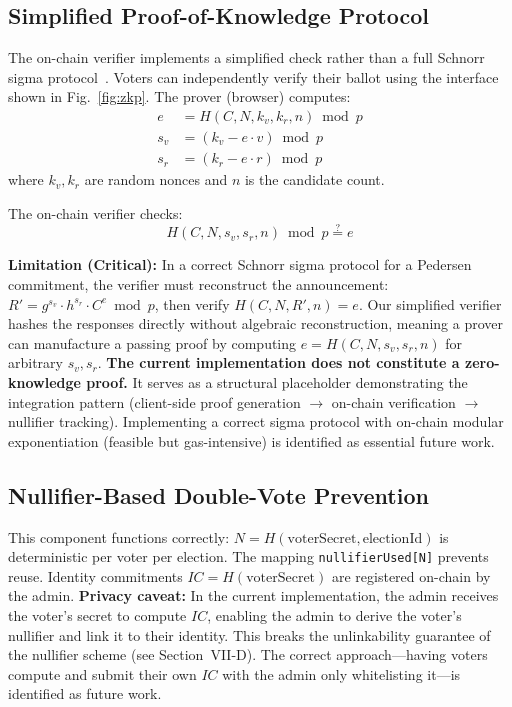\documentclass[conference]{IEEEtran}
\begin{document}
\subsection{Simplified Proof-of-Knowledge Protocol}

The on-chain verifier implements a simplified check rather than a full Schnorr sigma protocol~\cite{schnorr1991}. Voters can independently verify their ballot using the interface shown in Fig.~\ref{fig:zkp}. The prover (browser) computes:
\begin{align}
e &= H(C, N, k_v, k_r, n) \bmod p \\
s_v &= (k_v - e \cdot v) \bmod p \\
s_r &= (k_r - e \cdot r) \bmod p
\end{align}
where $k_v, k_r$ are random nonces and $n$ is the candidate count.

The on-chain verifier checks:
\[ H(C, N, s_v, s_r, n) \bmod p \stackrel{?}{=} e \]

\textbf{Limitation (Critical):} In a correct Schnorr sigma protocol for a Pedersen commitment, the verifier must reconstruct the announcement: $R' = g^{s_v} \cdot h^{s_r} \cdot C^e \bmod p$, then verify $H(C, N, R', n) = e$. Our simplified verifier hashes the responses directly without algebraic reconstruction, meaning a prover can manufacture a passing proof by computing $e = H(C, N, s_v, s_r, n)$ for arbitrary $s_v, s_r$. \textbf{The current implementation does not constitute a zero-knowledge proof.} It serves as a structural placeholder demonstrating the integration pattern (client-side proof generation $\rightarrow$ on-chain verification $\rightarrow$ nullifier tracking). Implementing a correct sigma protocol with on-chain modular exponentiation (feasible but gas-intensive) is identified as essential future work.

\subsection{Nullifier-Based Double-Vote Prevention}
This component functions correctly: $N = H(\text{voterSecret}, \text{electionId})$ is deterministic per voter per election. The mapping \texttt{nullifierUsed[N]} prevents reuse. Identity commitments $IC = H(\text{voterSecret})$ are registered on-chain by the admin. \textbf{Privacy caveat:} In the current implementation, the admin receives the voter's secret to compute $IC$, enabling the admin to derive the voter's nullifier and link it to their identity. This breaks the unlinkability guarantee of the nullifier scheme (see Section~VII-D). The correct approach---having voters compute and submit their own $IC$ with the admin only whitelisting it---is identified as future work.
\end{document}

